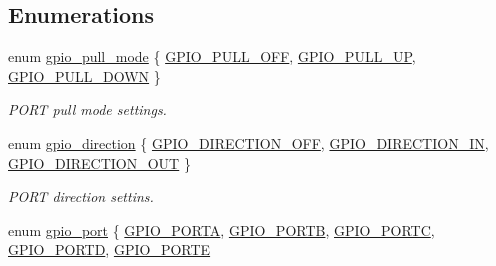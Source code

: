\subsection*{Enumerations}
\begin{DoxyCompactItemize}
\item 
enum \hyperlink{group___h_p_l_gab9959d4bcdc5049e5898d5100ada3197}{gpio\+\_\+pull\+\_\+mode} \{ \hyperlink{group___h_p_l_ggab9959d4bcdc5049e5898d5100ada3197a904014efc4ca8e6ab21b5fdf8dead41b}{G\+P\+I\+O\+\_\+\+P\+U\+L\+L\+\_\+\+O\+FF}, 
\hyperlink{group___h_p_l_ggab9959d4bcdc5049e5898d5100ada3197ae7d1b2a9078939dd744dd9a7cd61d9df}{G\+P\+I\+O\+\_\+\+P\+U\+L\+L\+\_\+\+UP}, 
\hyperlink{group___h_p_l_ggab9959d4bcdc5049e5898d5100ada3197a93970a9b4ab92816371682f4e537a8e2}{G\+P\+I\+O\+\_\+\+P\+U\+L\+L\+\_\+\+D\+O\+WN}
 \}\begin{DoxyCompactList}\small\item\em P\+O\+RT pull mode settings. \end{DoxyCompactList}
\item 
enum \hyperlink{group___h_p_l_gaccc7d029df9e5a96151a68e64f4be7e2}{gpio\+\_\+direction} \{ \hyperlink{group___h_p_l_ggaccc7d029df9e5a96151a68e64f4be7e2ae5e30917e4c3b63976e3785711a268f6}{G\+P\+I\+O\+\_\+\+D\+I\+R\+E\+C\+T\+I\+O\+N\+\_\+\+O\+FF}, 
\hyperlink{group___h_p_l_ggaccc7d029df9e5a96151a68e64f4be7e2aea9c54895635603d054830602ba5fb4e}{G\+P\+I\+O\+\_\+\+D\+I\+R\+E\+C\+T\+I\+O\+N\+\_\+\+IN}, 
\hyperlink{group___h_p_l_ggaccc7d029df9e5a96151a68e64f4be7e2a869f710c2bafc06d7ef192861b8358ab}{G\+P\+I\+O\+\_\+\+D\+I\+R\+E\+C\+T\+I\+O\+N\+\_\+\+O\+UT}
 \}\begin{DoxyCompactList}\small\item\em P\+O\+RT direction settins. \end{DoxyCompactList}
\item 
enum \hyperlink{group___h_p_l_ga6d50d8c4b17ff573c07340d4d7965bc1}{gpio\+\_\+port} \{ \newline
\hyperlink{group___h_p_l_gga6d50d8c4b17ff573c07340d4d7965bc1a0d36b47f173bbc4bdced28d8a54fe4ac}{G\+P\+I\+O\+\_\+\+P\+O\+R\+TA}, 
\hyperlink{group___h_p_l_gga6d50d8c4b17ff573c07340d4d7965bc1a258a8ca8e34cedcfba339d2463ae0c2a}{G\+P\+I\+O\+\_\+\+P\+O\+R\+TB}, 
\hyperlink{group___h_p_l_gga6d50d8c4b17ff573c07340d4d7965bc1a3266325667899f8d82c0624c493fda51}{G\+P\+I\+O\+\_\+\+P\+O\+R\+TC}, 
\hyperlink{group___h_p_l_gga6d50d8c4b17ff573c07340d4d7965bc1a4db7e328496cabe7a12e3879f7be8e39}{G\+P\+I\+O\+\_\+\+P\+O\+R\+TD}, 
\newline
\hyperlink{group___h_p_l_gga6d50d8c4b17ff573c07340d4d7965bc1ae00a95999282684e3c5d713937bc74e3}{G\+P\+I\+O\+\_\+\+P\+O\+R\+TE}

\end{DoxyCompactItemize}

